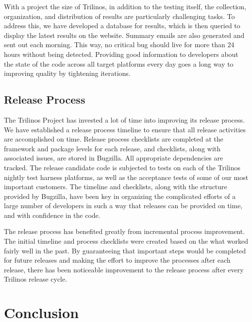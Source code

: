 \documentclass{doublecol}
\begin{document}
With a project the size of Trilinos, in addition to the testing
itself, the collection, organization, and distribution of results
are particularly challenging tasks.  To address this, we have
developed a database for results, which is then queried to display
the latest results on the website.  Summary emails are also
generated and sent out each morning.  This way, no critical bug
should live for more than 24 hours without being detected. Providing
good information to developers about the state of the code across
all target platforms every day goes a long way to improving quality
by tightening iterations.

\subsection{Release Process}

The Trilinos Project has invested a lot of time into improving its
release process.  We have established a release process timeline to
ensure that all release activities are accomplished on time. Release
process checklists are completed at the framework and package levels
for each release, and checklists, along with associated issues, are
stored in Bugzilla.  All appropriate dependencies are tracked.  The
release candidate code is subjected to tests on each of the Trilinos
nightly test harness platforms, as well as the acceptance tests of
some of our most important customers.  The timeline and checklists,
along with the structure provided by Bugzilla, have been key in
organizing the complicated efforts of a large number of developers
in such a way that releases can be provided on time, and with
confidence in the code.

The release process has benefited greatly from incremental process
improvement. The initial timeline and process checklists were
created based on the what worked fairly well in the past.  By
guaranteeing that important steps would be completed for future
releases and making the effort to improve the processes after each
release, there has been noticeable improvement to the release
process after every Trilinos release cycle.



\section{Conclusion}
\label{Section:Conclusion}
\end{document}
